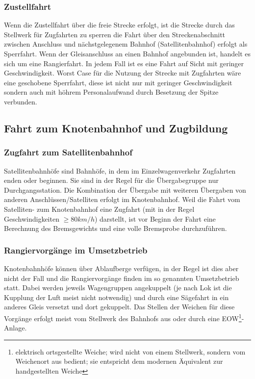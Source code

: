 \subsubsection{Zustellfahrt}\label{sec:Zustellfahrt}
Wenn die Zustellfahrt über die freie Strecke erfolgt, ist die Strecke durch das Stellwerk für \gls{Zugfahrt}en zu sperren die Fahrt über den Streckenabschnitt zwischen Anschluss und nächstgelegenem Bahnhof (\gls{Satellitenbahnhof}) erfolgt als \gls{Sperrfahrt}. Wenn der \gls{Gleisanschluss} an einen Bahnhof angebunden ist, handelt es sich um eine \gls{Rangierfahrt}. In jedem Fall ist es eine Fahrt auf Sicht mit geringer Geschwindigkeit. Worst Case für die Nutzung der Strecke mit \gls{Zugfahrt}en wäre eine geschobene \gls{Sperrfahrt}, diese ist nicht nur mit geringer Geschwindigkeit sondern auch mit höhrem Personalaufwand durch Besetzung der Spitze verbunden.

\subsection{Fahrt zum Knotenbahnhof und Zugbildung}
\subsubsection{Zugfahrt zum Satellitenbahnhof}\label{sec:Zugfahrt}
Satellitenbahnhöfe sind Bahnhöfe, in dem im Einzelwagenverkehr \gls{Zugfahrt}en enden oder beginnen. Sie sind in der Regel für die Übergabegruppe nur Durchgangsstation. Die Kombination der Übergabe mit weiteren Übergaben von anderen Anschlüssen/Satelliten erfolgt im \gls{Knotenbahnhof}. Weil die Fahrt vom Satelliten- zum \gls{Knotenbahnhof} eine \gls{Zugfahrt} (mit in der Regel Geschwindigkeiten $\ge 80 km/h$) darstellt, ist vor Beginn der Fahrt eine Berechnung des Bremsgewichts und eine volle \gls{Bremsprobe} durchzuführen.%
\subsubsection{Rangiervorgänge im Umsetzbetrieb}\label{sec:Rangierfahrt}
Knotenbahnhöfe können über \gls{Ablaufberg}e verfügen, in der Regel ist dies aber nicht der Fall und die Rangiervorgänge finden im so genannten Umsetzbetrieb statt. Dabei werden jeweils Wagengruppen angekuppelt (je nach Lok ist die Kupplung der Luft meist nicht notwendig) und durch eine Sägefahrt in ein anderes Gleis versetzt und dort gekuppelt. Das Stellen der Weichen für diese Vorgänge erfolgt meist vom Stellwerk des Bahnhofs aus oder durch eine \gls{EOW}\footnote{elektrisch ortsgestellte Weiche; wird nicht von einem Stellwerk, sondern vom Weichenort aus bedient; sie entspricht dem modernen Äquivalent zur handgestellten Weiche}-Anlage.
